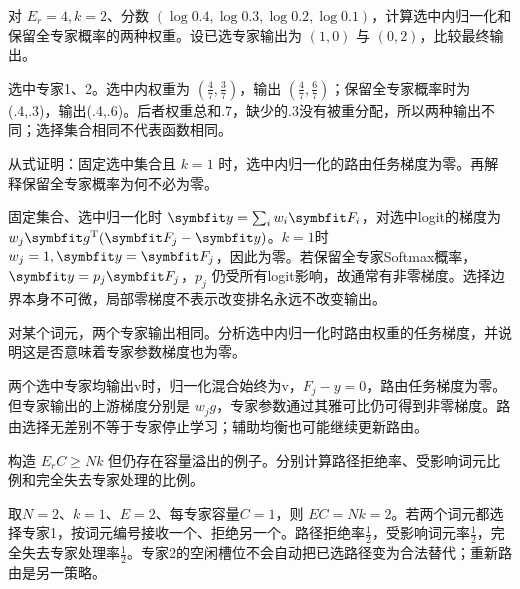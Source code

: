 
\begin{exercises}
\begin{exercise} 对 $E_r=4,k=2$、分数 $(\log0.4,\log0.3,\log0.2,\log0.1)$，计算选中内归一化和保留全专家概率的两种权重。设已选专家输出为 $(1,0)$ 与 $(0,2)$，比较最终输出。

\begin{solution}
选中专家1、2。选中内权重为 $(\frac{4}{7},\frac{3}{7})$，输出 $(\frac{4}{7},\frac{6}{7})$；保留全专家概率时为(.4,.3)，输出(.4,.6)。后者权重总和.7，缺少的.3没有被重分配，所以两种输出不同；选择集合相同不代表函数相同。
\end{solution}
\end{exercise}

\begin{exercise} 从式证明：固定选中集合且 $k=1$ 时，选中内归一化的路由任务梯度为零。再解释保留全专家概率为何不必为零。

\begin{solution}
固定集合、选中归一化时 $\vect{y}=\sum_iw_i\vect{F}_i$，对选中logit的梯度为 $w_j\vect{g}^{\mathrm{T}}(\vect{F}_j-\vect{y})$。$k=1$时 $w_j=1,\vect{y}=\vect{F}_j$，因此为零。若保留全专家Softmax概率，$\vect{y}=p_j\vect{F}_j$，$p_j$ 仍受所有logit影响，故通常有非零梯度。选择边界本身不可微，局部零梯度不表示改变排名永远不改变输出。
\end{solution}
\end{exercise}

\begin{exercise}\optional 对某个词元，两个专家输出相同。分析选中内归一化时路由权重的任务梯度，并说明这是否意味着专家参数梯度也为零。

\begin{solution}
两个选中专家均输出v时，归一化混合始终为v，$F_j-y=0$，路由任务梯度为零。但专家输出的上游梯度分别是 $w_jg$，专家参数通过其雅可比仍可得到非零梯度。路由选择无差别不等于专家停止学习；辅助均衡也可能继续更新路由。
\end{solution}
\end{exercise}

\begin{exercise} 构造 $E_rC\ge Nk$ 但仍存在容量溢出的例子。分别计算路径拒绝率、受影响词元比例和完全失去专家处理的比例。

\begin{solution}
取$N=2$、$k=1$、$E=2$、每专家容量$C=1$，则 $EC=Nk=2$。若两个词元都选择专家1，按词元编号接收一个、拒绝另一个。路径拒绝率$\frac{1}{2}$，受影响词元率$\frac{1}{2}$，完全失去专家处理率$\frac{1}{2}$。专家2的空闲槽位不会自动把已选路径变为合法替代；重新路由是另一策略。
\end{solution}
\end{exercise}


\end{exercises}
